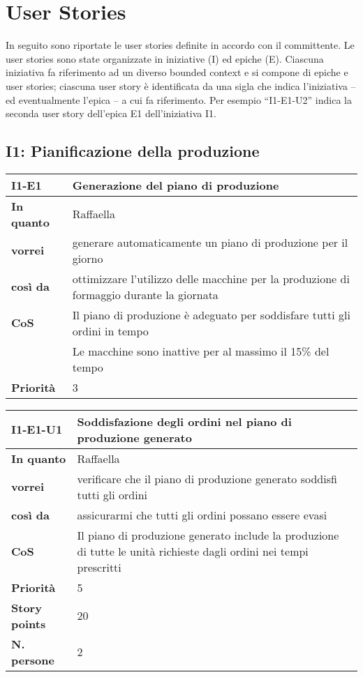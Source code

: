 \chapter{User Stories}
\label{app:user-stories}
In seguito sono riportate le user stories definite in accordo con il committente. Le user stories sono state organizzate in iniziative (I) ed epiche (E).
Ciascuna iniziativa fa riferimento ad un diverso bounded context e si compone di epiche e user stories; ciascuna user story è identificata da una sigla che indica l'iniziativa -- ed eventualmente l'epica -- a cui fa riferimento. Per esempio ``I1-E1-U2'' indica la seconda user story dell'epica E1 dell'iniziativa I1.

\section*{I1: Pianificazione della produzione}

\begin{table}[H]
  \begin{tabularx}{\textwidth}{lX}
    \toprule
    \textbf{I1-E1} & \textbf{Generazione del piano di produzione} \\
    \midrule
    \textbf{In quanto} & Raffaella \\
    \textbf{vorrei} & generare automaticamente un piano di produzione per il giorno \\
    \textbf{così da} & ottimizzare l'utilizzo delle macchine per la produzione di formaggio durante la giornata \\
    \midrule
    \textbf{CoS} & Il piano di produzione è adeguato per soddisfare tutti gli ordini in tempo \\
    & Le macchine sono inattive per al massimo il 15\% del tempo \\
    \midrule
    \textbf{Priorità} & 3 \\
    \bottomrule
  \end{tabularx}
  \label{user-story:i1-e1}
\end{table}

\begin{table}[H]
  \begin{tabularx}{\textwidth}{lX}
    \toprule
    \textbf{I1-E1-U1} & \textbf{Soddisfazione degli ordini nel piano di produzione generato} \\
    \midrule
    \textbf{In quanto} & Raffaella \\
    \textbf{vorrei} & verificare che il piano di produzione generato soddisfi tutti gli ordini \\
    \textbf{così da} & assicurarmi che tutti gli ordini possano essere evasi \\
    \midrule
    \textbf{CoS} & Il piano di produzione generato include la produzione di tutte le unità richieste dagli ordini nei tempi prescritti \\
    \midrule
    \textbf{Priorità} & 5 \\
    \textbf{Story points} & 20 \\
    \textbf{N. persone} & 2 \\
    \bottomrule
  \end{tabularx}
  \label{user-story:i1-e1-u1}
\end{table}

